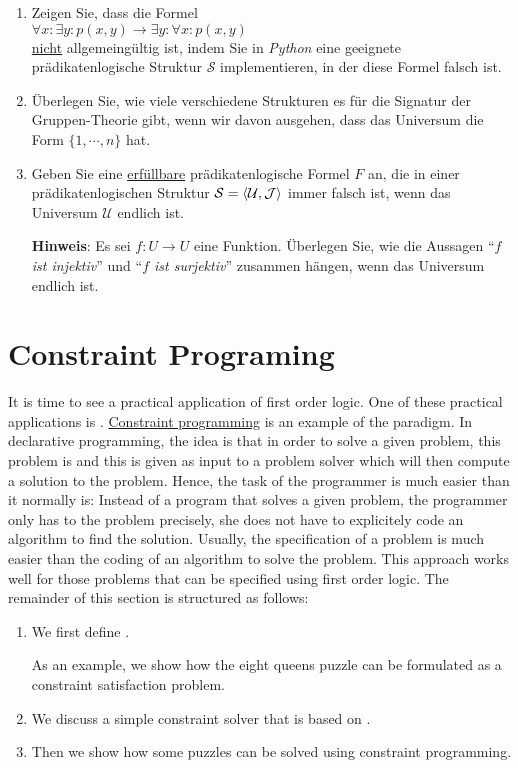 \exercise
\begin{enumerate}
\item Zeigen Sie, dass die Formel
      \\[0.2cm]
      \hspace*{1.3cm}
      $\forall x: \exists y: p(x,y) \rightarrow \exists y: \forall x: p(x,y)$
      \\[0.2cm]
      \underline{nicht} allgemeingültig ist, indem Sie in \textsl{Python} eine geeignete
      prädikatenlogische Struktur $\mathcal{S}$ implementieren, in der diese Formel falsch ist.
\item Überlegen Sie, wie viele verschiedene Strukturen es für die Signatur der Gruppen-Theorie gibt, wenn wir davon
      ausgehen, dass das Universum die Form $\{1, \cdots, n\}$ hat.
\item Geben Sie eine \underline{erfüllbare} prädikatenlogische Formel $F$ an, die in einer prädikatenlogischen
      Struktur $\mathcal{S} = \pair(\mathcal{U},\mathcal{J})$ immer falsch ist, wenn das Universum $\mathcal{U}$ endlich ist.

      \textbf{Hinweis}: Es sei $f:U \rightarrow U$ eine Funktion.  Überlegen Sie, wie die Aussagen
      ``\emph{$f$ ist injektiv}'' und ``\emph{$f$ ist surjektiv}'' zusammen hängen, wenn das Universum endlich ist.
      \exend  
\end{enumerate}

\section{Constraint Programing}
It is time to see a practical application of first order logic.  One of these practical applications is .  
\href{https://en.wikipedia.org/wiki/Constraint_programming}{Constraint programming} is an example of the
  paradigm.  In declarative programming, the idea is that 
in order to solve a given problem, this problem is  and this  is
given as input to a problem solver which will then compute a solution to the problem.  Hence, the task of the
programmer is much easier than it normally is: Instead of  a program that solves a given problem,
the programmer only has to  the problem precisely, she does not have to explicitely code an algorithm to find the
solution.  Usually, the specification of a problem is much easier than the coding of an algorithm to solve the problem.  This approach works well for those problems
that can be specified using first order logic.  The remainder of this section is structured as follows:
\begin{enumerate}
\item We first define .

      As an example, we show how the eight queens puzzle can be formulated as a constraint satisfaction
      problem.  
\item We discuss a simple constraint solver that is based on .
\item Then we show how some puzzles can be solved using constraint programming.
\end{enumerate}

